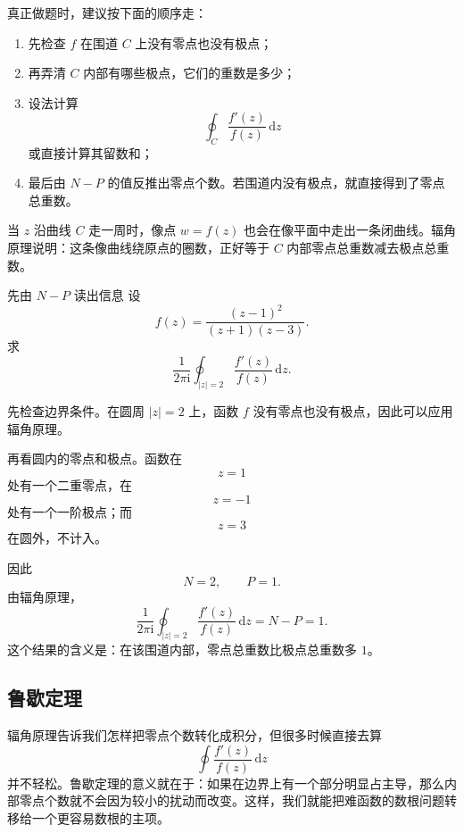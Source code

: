 \begin{tishi}[辐角原理怎么使用]
真正做题时，建议按下面的顺序走：
\begin{enumerate}
    \item 先检查 $f$ 在围道 $C$ 上没有零点也没有极点；
    \item 再弄清 $C$ 内部有哪些极点，它们的重数是多少；
    \item 设法计算
    \[
        \oint_C \frac{f'(z)}{f(z)}\,\mathrm{d}z
    \]
    或直接计算其留数和；
    \item 最后由 $N-P$ 的值反推出零点个数。若围道内没有极点，就直接得到了零点总重数。
\end{enumerate}
\end{tishi}

\begin{tishi}[辐角原理的几何意义]
当 $z$ 沿曲线 $C$ 走一周时，像点 $w=f(z)$ 也会在像平面中走出一条闭曲线。辐角原理说明：这条像曲线绕原点的圈数，正好等于 $C$ 内部零点总重数减去极点总重数。
\end{tishi}

\begin{lizi}{先由 $N-P$ 读出信息}{}
设
\[
    f(z)=\frac{(z-1)^2}{(z+1)(z-3)}.
\]
求
\[
    \frac{1}{2\pi \mathrm{i}}
    \oint_{|z|=2}\frac{f'(z)}{f(z)}\,\mathrm{d}z.
\]

\begin{jie}
先检查边界条件。在圆周 $|z|=2$ 上，函数 $f$ 没有零点也没有极点，因此可以应用辐角原理。

再看圆内的零点和极点。函数在
\[
    z=1
\]
处有一个二重零点，在
\[
    z=-1
\]
处有一个一阶极点；而
\[
    z=3
\]
在圆外，不计入。

因此
\[
    N=2,\qquad P=1.
\]
由辐角原理，
\[
    \frac{1}{2\pi \mathrm{i}}
    \oint_{|z|=2}\frac{f'(z)}{f(z)}\,\mathrm{d}z
    =
    N-P
    =
    1.
\]
这个结果的含义是：在该围道内部，零点总重数比极点总重数多 $1$。
\end{jie}
\end{lizi}

\subsection{鲁歇定理}

辐角原理告诉我们怎样把零点个数转化成积分，但很多时候直接去算
\[
    \oint \frac{f'(z)}{f(z)}\,\mathrm{d}z
\]
并不轻松。鲁歇定理的意义就在于：如果在边界上有一个部分明显占主导，那么内部零点个数就不会因为较小的扰动而改变。这样，我们就能把难函数的数根问题转移给一个更容易数根的主项。

